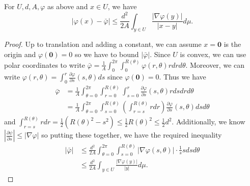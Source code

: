 \begin{lemma}
    For \(U,d,A,\varphi\) as above and \(x\in U\), we have
    \[
        |\varphi(x)-\bar\varphi| \leq \frac{d^2}{2A}\int_{y\in
        U}\frac{|\nabla \varphi(y)|}{|x-y|} d\mu.
    \]

    \begin{proof}
        Up to translation and adding a constant, we can assume \(x=\mathbf{0}\)
        is the origin and \(\varphi(\mathbf{0})=0\) so we have to bound
        \(|\bar\varphi|\). Since \(U\) is convex, we
        can use polar coordinates to write \(\bar\varphi =
        \frac{1}{A}\int_0^{2\pi}\int_0^{R(\theta)}\varphi(r,\theta)rdrd\theta\).
        Moreover, we can write \(\varphi(r,\theta)=\int_0^r \frac{\partial
        \varphi}{\partial s}(s,\theta)ds\) since \(\varphi(\mathbf{0})=0\). Thus
        we have
        \begin{align*}
            \bar\varphi
            &= \frac{1}{A}\int_{\theta=0}^{2\pi} \int_{r=0}^{R(\theta)}
            \int_{s=0}^r \frac{\partial \varphi}{\partial s}(s,\theta)
            rdsdrd\theta\\
            &= \frac{1}{A} \int_{\theta=0}^{2\pi} \int_{s=0}^{R(\theta)}
            \left( \int_{r=s}^{R(\theta)} rdr\right) \frac{\partial
            \varphi}{\partial s}(s,\theta) dsd\theta
        \end{align*}
        and \(\int_{r=s}^{R(\theta)}rdr =\frac{1}{2}(R(\theta)^2-s^2) \leq
        \frac{1}{2}R(\theta)^2 \leq \frac{1}{2}d^2\). Additionally, we know
        \(|\frac{\partial \psi}{\partial s}|\leq |\nabla \varphi|\) so putting
        these together, we have the required inequality
        \begin{align*}
            |\bar\varphi|
            &\leq \frac{d^2}{2A} \int_{\theta=0}^{2\pi} \int_{s=0}^{R(\theta)}
             |\nabla\varphi(s,\theta)| \cdot \frac{1}{s} sdsd\theta \\
            &\leq \frac{d^2}{2A} \int_{y\in U} \frac{|\nabla
            \varphi(y)|}{|y|}d\mu.
        \end{align*}
    \end{proof}
\end{lemma}

